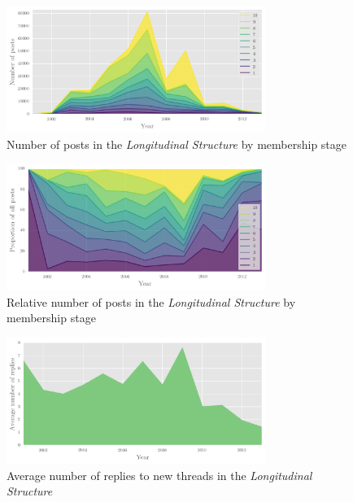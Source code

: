 \begin{figure}[htb]
\centering
\includegraphics[width=0.75\textwidth]{../images/posts-by-year.png}
\caption[Number of posts in the \emph{Longitudinal Structure}]{Number of posts in the \emph{Longitudinal Structure} by membership stage}
\label{fig:stage_year}
\end{figure}

\begin{figure}[htb]
\centering
\includegraphics[width=0.75\textwidth]{../images/posts-by-year-filled.png}
\caption[Relative number of posts in the \emph{Longitudinal Structure}]{Relative number of posts in the \emph{Longitudinal Structure} by membership stage}
\label{fig:stage_year_filled}
\end{figure}

\begin{figure}[htb]
\centering
\includegraphics[width=0.75\textwidth]{../images/avg-replies.png}
\caption[Replies to new threads in the \emph{Longitudinal Structure}]{Average number of replies to new threads in the \emph{Longitudinal Structure}}
\label{fig:avg_replies}
\end{figure}

